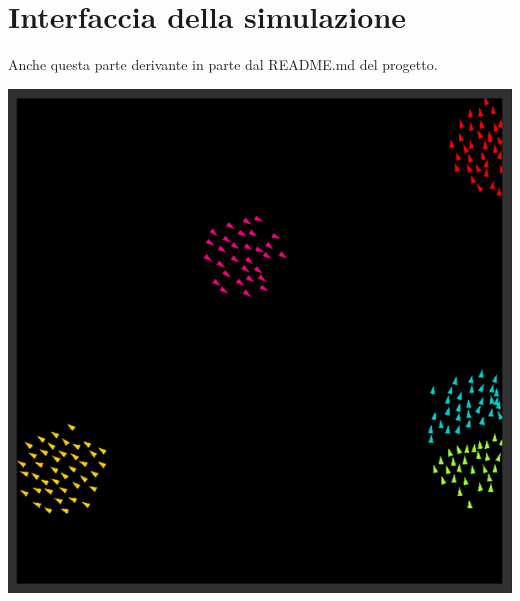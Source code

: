 \documentclass[10pt,a4paper]{article}
\begin{document}
\newpage

\section{Interfaccia della simulazione}

Anche questa parte derivante in parte dal README.md del progetto.





\begin{center}
    \includegraphics[width=1.0\textwidth]{../images/interface.png}
\end{center}
\end{document}
